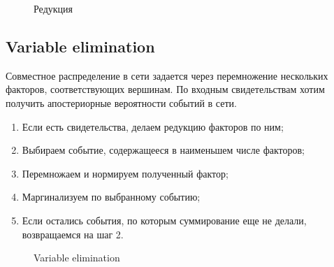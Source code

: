 \documentclass[a4paper,12pt]{article}
\begin{document}
\begin{figure}[h!]
    \caption{Редукция}
\end{figure}

\subsection{Variable elimination}
Совместное распределение в сети задается через перемножение нескольких факторов, соответствующих вершинам. 
По входным свидетельствам хотим получить апостериорные вероятности событий в сети. 

\begin{enumerate}
    \item Если есть свидетельства, делаем редукцию факторов по ним;
    \item Выбираем событие, содержащееся в наименьшем числе факторов;
    \item Перемножаем и нормируем полученный фактор;
    \item Маргинализуем по выбранному событию;
    \item Если остались события, по которым суммирование еще не делали, возвращаемся на шаг 2.
\end{enumerate}

\begin{figure}[h!]
    \caption{Variable elimination}
\end{figure}
\end{document}

